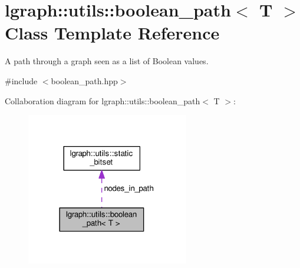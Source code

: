 \hypertarget{classlgraph_1_1utils_1_1boolean__path}{}\section{lgraph\+:\+:utils\+:\+:boolean\+\_\+path$<$ T $>$ Class Template Reference}
\label{classlgraph_1_1utils_1_1boolean__path}


A path through a graph seen as a list of Boolean values.  




{\ttfamily \#include $<$boolean\+\_\+path.\+hpp$>$}



Collaboration diagram for lgraph\+:\+:utils\+:\+:boolean\+\_\+path$<$ T $>$\+:
\nopagebreak
\begin{figure}[H]
\begin{center}
\leavevmode
\includegraphics[width=201pt]{classlgraph_1_1utils_1_1boolean__path__coll__graph}
\end{center}
\end{figure}
